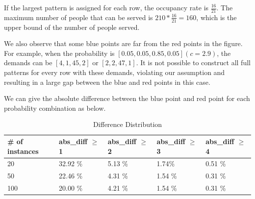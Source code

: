 
If the largest pattern is assigned for each row, the occupancy rate is $\frac{16}{21}$. The maximum number of people that can be served is $210 * \frac{16}{21} = 160$, which is the upper bound of the number of people served.

We also observe that some blue points are far from the red points in the figure. For example, when the probability is $[0.05, 0.05, 0.85, 0.05] (c = 2.9)$, the demands can be $[4, 1, 45, 2]$ or $[2, 2, 47, 1]$. It is not possible to construct all full patterns for every row with these demands, violating our assumption and resulting in a large gap between the blue and red points in this case.






We can give the absolute difference between the blue point and red point for each probability combination as below.

\begin{table}[ht]
  \centering
  \caption{Difference Distribution}
  \begin{tabular}{|l|l|l|l|l|}
  \hline
  \# of instances & abs\_diff $\geq$ 1 & abs\_diff $\geq$ 2 & abs\_diff $\geq$ 3 & abs\_diff $\geq$ 4 \\
  \hline
  20 & 32.92 \% & 5.13 \% & 1.74\% & 0.51 \% \\
  50 & 22.46 \% & 4.31 \% & 1.54 \% & 0.31 \%  \\
  100 & 20.00 \% & 4.21 \% & 1.54 \% & 0.31 \% \\
  \hline
  \end{tabular}
\end{table}



